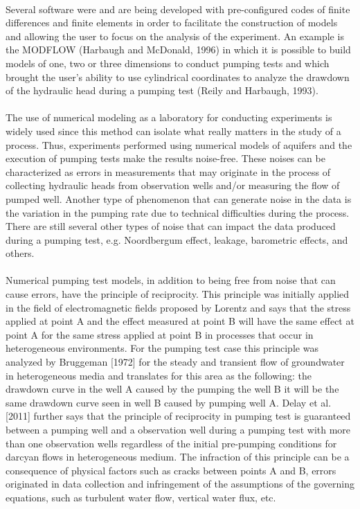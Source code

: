 \documentclass[11pt, a4paper]{article}
\begin{document}
    \paragraph{} %
    Several software were and are being developed with pre-configured codes of finite differences and finite elements in order to facilitate the construction of models and allowing the user to focus on the analysis of the experiment. An example is the MODFLOW (Harbaugh and McDonald, 1996) in which it is possible to build models of one, two or three dimensions to conduct pumping tests and which brought the user's ability to use cylindrical coordinates to analyze the drawdown of the hydraulic head during a pumping test (Reily and Harbaugh, 1993).
    \paragraph{} %
    The use of numerical modeling as a laboratory for conducting experiments is widely used since this method can isolate what really matters in the study of a process. Thus, experiments performed using numerical models of aquifers and the execution of pumping tests make the results noise-free. These noises can be characterized as errors in measurements that may originate in the process of collecting hydraulic heads from observation wells and/or measuring the flow of pumped well. Another type of phenomenon that can generate noise in the data is the variation in the pumping rate due to technical difficulties during the process. There are still several other types of noise that can impact the data produced during a pumping test, e.g. Noordbergum effect, leakage, barometric effects, and others.
    \paragraph{} %
    Numerical pumping test models, in addition to being free from noise that can cause errors, have the principle of reciprocity. This principle was initially applied in the field of electromagnetic fields proposed by Lorentz and says that the stress applied at point A and the effect measured at point B will have the same effect at point A for the same stress applied at point B in processes that occur in heterogeneous environments. For the pumping test case this principle was analyzed by Bruggeman [1972] for the steady and transient flow of groundwater in heterogeneous media and translates for this area as the following: the drawdown curve in the well A caused by the pumping the well B it will be the same drawdown curve seen in well B caused by pumping well A. Delay et al. [2011] further says that the principle of reciprocity in pumping test is guaranteed between a pumping well and a observation well during a pumping test with more than one observation wells regardless of the initial pre-pumping conditions for darcyan flows in heterogeneous medium. The infraction of this principle can be a consequence of physical factors such as cracks between points A and B, errors originated in data collection and infringement of the assumptions of the governing equations, such as turbulent water flow, vertical water flux, etc.
    
\end{document}
